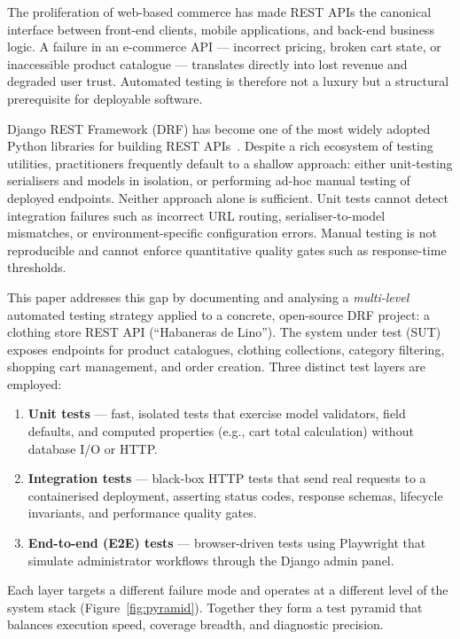 \documentclass[12pt, a4paper]{article}
\begin{document}
The proliferation of web-based commerce has made REST APIs the canonical
interface between front-end clients, mobile applications, and back-end business
logic.  A failure in an e-commerce API — incorrect pricing, broken cart state, or
inaccessible product catalogue — translates directly into lost revenue and
degraded user trust.  Automated testing is therefore not a luxury but a
structural prerequisite for deployable software.

Django REST Framework (DRF) has become one of the most widely adopted Python
libraries for building REST APIs~\cite{django_rest_framework}.  Despite a rich
ecosystem of testing utilities, practitioners frequently default to a shallow
approach: either unit-testing serialisers and models in isolation, or performing
ad-hoc manual testing of deployed endpoints.  Neither approach alone is
sufficient.  Unit tests cannot detect integration failures such as incorrect URL
routing, serialiser-to-model mismatches, or environment-specific configuration
errors.  Manual testing is not reproducible and cannot enforce quantitative
quality gates such as response-time thresholds.

This paper addresses this gap by documenting and analysing a \textit{multi-level}
automated testing strategy applied to a concrete, open-source DRF project: a
clothing store REST API (``Habaneras de Lino'').  The system under test (SUT)
exposes endpoints for product catalogues, clothing collections, category
filtering, shopping cart management, and order creation.  Three distinct test
layers are employed:

\begin{enumerate}[label=\arabic*.]
    \item \textbf{Unit tests} — fast, isolated tests that exercise model
    validators, field defaults, and computed properties (e.g., cart total
    calculation) without database I/O or HTTP.
    \item \textbf{Integration tests} — black-box HTTP tests that send real
    requests to a containerised deployment, asserting status codes, response
    schemas, lifecycle invariants, and performance quality gates.
    \item \textbf{End-to-end (E2E) tests} — browser-driven tests using
    Playwright that simulate administrator workflows through the Django admin
    panel.
\end{enumerate}

Each layer targets a different failure mode and operates at a different level of
the system stack (Figure~\ref{fig:pyramid}).  Together they form a test pyramid
that balances execution speed, coverage breadth, and diagnostic precision.
\end{document}
